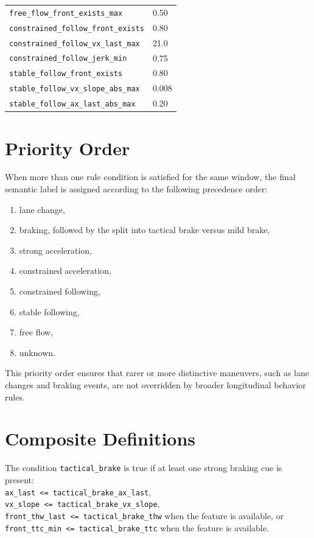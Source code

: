 \begin{table}[htbp]
\begin{tabular}{l l}
\texttt{free\_flow\_front\_exists\_max} & 0.50 \\
\texttt{constrained\_follow\_front\_exists} & 0.80 \\
\texttt{constrained\_follow\_vx\_last\_max} & 21.0 \\
\texttt{constrained\_follow\_jerk\_min} & 0.75 \\
\texttt{stable\_follow\_front\_exists} & 0.80 \\
\texttt{stable\_follow\_vx\_slope\_abs\_max} & 0.008 \\
\texttt{stable\_follow\_ax\_last\_abs\_max} & 0.20 \\
\bottomrule
\end{tabular}
\end{table}


\section{Priority Order}

When more than one rule condition is satisfied for the same window, the final semantic label is assigned according to the following precedence order:
\begin{enumerate}
    \item lane change,
    \item braking, followed by the split into tactical brake versus mild brake,
    \item strong acceleration,
    \item constrained acceleration,
    \item constrained following,
    \item stable following,
    \item free flow,
    \item unknown.
\end{enumerate}
This priority order ensures that rarer or more distinctive maneuvers, such as lane changes and braking events, are not overridden by broader longitudinal behavior rules.
 
\section{Composite Definitions}
\par The condition \texttt{tactical\_brake} is true if at least one strong braking cue is present:\\
\texttt{ax\_last <= tactical\_brake\_ax\_last},\\
\texttt{vx\_slope <= tactical\_brake\_vx\_slope},\\
\texttt{front\_thw\_last <= tactical\_brake\_thw} when the feature is available, or\\
\texttt{front\_ttc\_min <= tactical\_brake\_ttc} when the feature is available.\\

